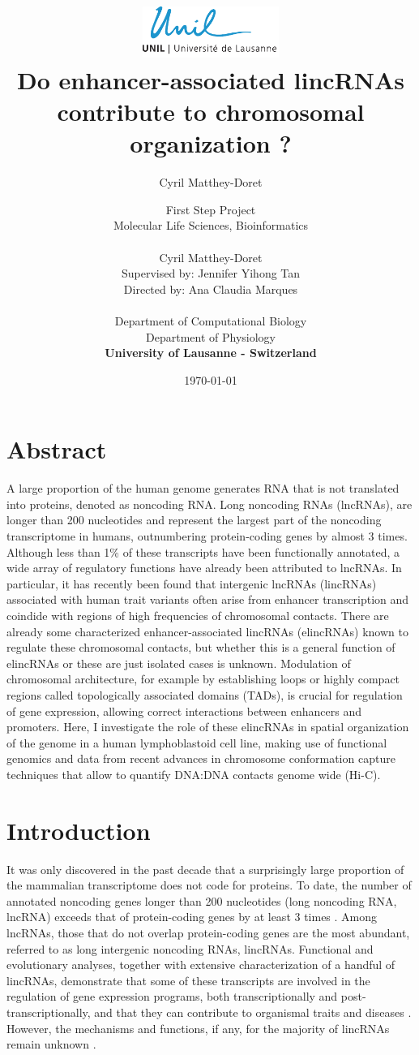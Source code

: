 \documentclass[11pt,a4paper]{report}
\author{Cyril Matthey-Doret}
\title{
\includegraphics[width=1.75in]{lo_unil06_bleu.pdf} \\
\vspace*{1in}
\textbf{Do enhancer-associated lincRNAs contribute to chromosomal organization ?}}
\author{\Large{First Step Project}\\
		Molecular Life Sciences, Bioinformatics\\
				\vspace*{0.5in} \\
		Cyril Matthey-Doret\\
        Supervised by: Jennifer Yihong Tan\\
        Directed by: Ana Claudia Marques\\
		\vspace*{0.5in} \\
		Department of Computational Biology\\
		Department of Physiology\\
        \textbf{University of Lausanne - Switzerland}\\
       } \date{\today}
\begin{document}
\renewcommand{\headrulewidth}{1pt}
\maketitle

\section*{Abstract}

A large proportion of the human genome generates RNA that is not translated into proteins, denoted as noncoding RNA. Long noncoding RNAs (lncRNAs), are longer than 200 nucleotides and represent the largest part of the noncoding transcriptome in humans, outnumbering protein-coding genes by almost 3 times. Although less than 1\% of these transcripts have been functionally annotated, a wide array of regulatory functions have already been attributed to lncRNAs. In particular, it has recently been found that intergenic lncRNAs (lincRNAs) associated with human trait variants often arise from enhancer transcription and coindide with regions of high frequencies of chromosomal contacts. There are already some characterized enhancer-associated lincRNAs (elincRNAs) known to regulate these chromosomal contacts, but whether this is a general function of elincRNAs or these are just isolated cases is unknown. Modulation of chromosomal architecture, for example by establishing loops or highly compact regions called topologically associated domains (TADs), is crucial for regulation of gene expression, allowing correct interactions between enhancers and promoters. Here, I investigate the role of these elincRNAs in spatial organization of the genome in a human lymphoblastoid cell line, making use of functional genomics and data from recent advances in chromosome conformation capture techniques that allow to quantify DNA:DNA contacts genome wide (Hi-C).

\section*{Introduction}
It was only discovered in the past decade that a surprisingly large proportion of the mammalian transcriptome does not code for proteins. To date, the number of annotated noncoding genes longer than 200 nucleotides (long noncoding RNA, lncRNA) exceeds that of protein-coding genes by at least 3 times \cite{Iyer2015}⁠. Among lncRNAs, those that do not overlap protein-coding genes are the most abundant, referred to as long intergenic noncoding RNAs, lincRNAs. Functional and evolutionary analyses, together with extensive characterization of a handful of lincRNAs, demonstrate that some of these transcripts are involved in the regulation of gene expression programs, both transcriptionally and post-transcriptionally, and that they can contribute to organismal traits and diseases \cite{Kornienko2013}⁠. However, the mechanisms and functions, if any, for the majority of lincRNAs remain unknown \cite{Rinn2012}⁠.  
\end{document}

